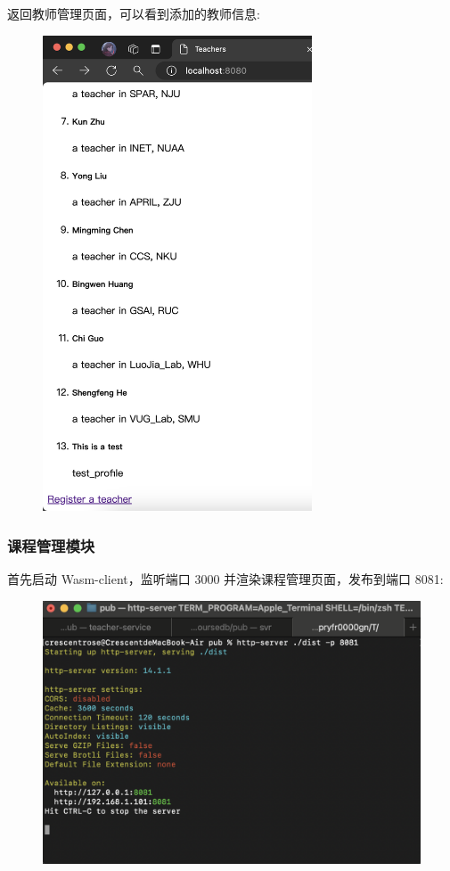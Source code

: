 \documentclass[12pt, oneside]{ctexart}
\numberwithin{figure}{section}
\numberwithin{table}{section}
\begin{document}
返回教师管理页面，可以看到添加的教师信息:
\begin{figure}[!htbp]
    \centering
    \includegraphics[width=8cm]{images/sec5/Add_Teacher_Check.png}
\end{figure}

\subsubsection{课程管理模块}

首先启动 Wasm-client，监听端口 3000 并渲染课程管理页面，发布到端口 8081:
\begin{figure}[!htbp]
    \centering
    \includegraphics[width=13cm]{images/sec5/wasm.png}
\end{figure}
\end{document}
